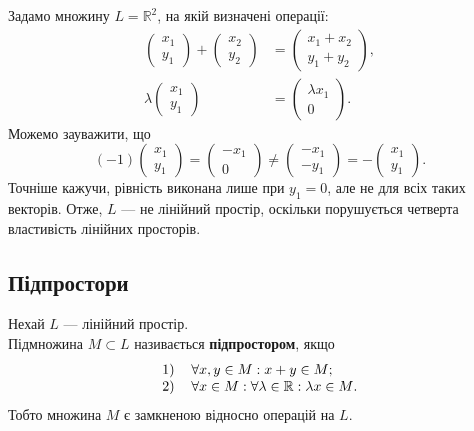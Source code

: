 \documentclass{math_library}
\begin{document}
	\begin{example}
	Задамо множину $L = \mathbb{R}^2$, на якій визначені операції:
	\begin{align*}
	\begin{pmatrix}
	x_1 \\ y_1
	\end{pmatrix} + \begin{pmatrix}
	x_2 \\ y_2
	\end{pmatrix} & = \begin{pmatrix}
	x_1 + x_2 \\ y_1+y_2
	\end{pmatrix}, \\
	\lambda \begin{pmatrix}
	x_1 \\ y_1
	\end{pmatrix} & = \begin{pmatrix}
	\lambda x_1 \\ 0
	\end{pmatrix}.
	\end{align*}
	Можемо зауважити, що
	\[ 
	(-1) \begin{pmatrix}
	x_1 \\ y_1
	\end{pmatrix} = \begin{pmatrix}
	-x_1 \\ 0
	\end{pmatrix} \neq \begin{pmatrix}
	-x_1 \\ -y_1
	\end{pmatrix} = - \begin{pmatrix}
	x_1 \\ y_1
	\end{pmatrix}.
	\]
	Точніше кажучи, рівність виконана лише при $y_1 = 0$, але не для всіх таких векторів. Отже, $L$ --- не лінійний простір, оскільки порушується четверта властивість лінійних просторів.
	\end{example}
	
	\subsection{Підпростори}
	\begin{definition}
	Нехай $L$ --- лінійний простір.\\
	Підмножина $M \subset L$ називається \textbf{підпростором}, якщо
	\begin{align*}
	\begin{tabular}{cl}
	1) & $\forall x, y \in M: x + y \in M$;\\
	2) & $\forall x \in M: \forall \lambda \in \mathbb{R}: \lambda x \in M$.
	\end{tabular}
	\end{align*}
	Тобто множина $M$ є замкненою відносно операцій на $L$.
	\end{definition}
	
\end{document}
